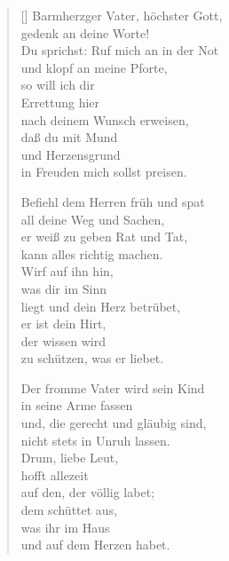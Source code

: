 \begin{multicols}{2}
\settowidth{\versewidth}{Ach, süßer Hort, wie tröstlich klingt,}
\begin{verse}[\versewidth]
 Barmherzger Vater, höchster Gott,\\
gedenk an deine Worte!\\
Du sprichst: Ruf mich an in der Not\\
und klopf an meine Pforte,\\
so will ich dir\\
Errettung hier\\
nach deinem Wunsch erweisen,\\
daß du mit Mund\\
und Herzensgrund\\
in Freuden mich sollst preisen.

 Befiehl dem Herren früh und spat\\
all deine Weg und Sachen,\\
er weiß zu geben Rat und Tat,\\
kann alles richtig machen.\\
Wirf auf ihn hin,\\
was dir im Sinn\\
liegt und dein Herz betrübet,\\
er ist dein Hirt,\\
der wissen wird\\
zu schützen, was er liebet.

 Der fromme Vater wird sein Kind\\
in seine Arme fassen\\
und, die gerecht und gläubig sind,\\
nicht stets in Unruh lassen.\\
Drum, liebe Leut,\\
hofft allezeit\\
auf den, der völlig labet;\\
dem schüttet aus,\\
was ihr im Haus\\
und auf dem Herzen habet.


\end{verse}
\end{multicols}
